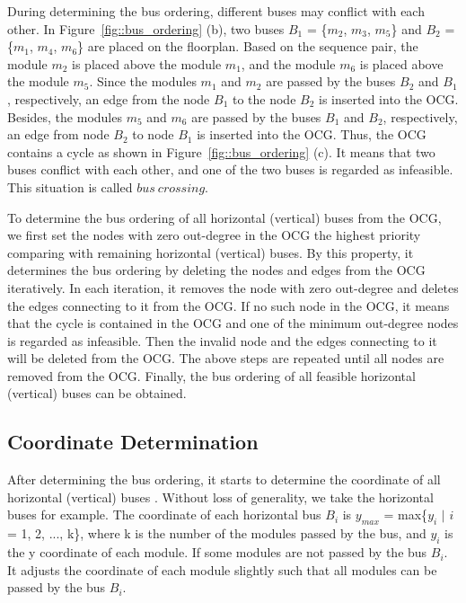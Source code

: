 During determining the bus ordering, different buses may conflict
with each other. In Figure~\ref{fig::bus_ordering} (b), two buses
$B_1$ = \{$m_2$, $m_3$, $m_5$\} and $B_2$ = \{$m_1$, $m_4$,
$m_6$\} are placed on the floorplan. Based on the sequence
pair, the module $m_2$ is placed above the module $m_1$, and the
module $m_6$ is placed above the module $m_5$. Since the modules
$m_1$ and $m_2$ are passed by the buses $B_2$ and $B_1$,
respectively, an edge from the node $B_1$ to the node $B_2$ is
inserted into the OCG. Besides, the modules $m_5$ and $m_6$
are passed by the buses $B_1$ and $B_2$, respectively, an edge
from node $B_2$ to node $B_1$ is inserted into the OCG. Thus, the OCG
contains a cycle as shown in Figure~\ref{fig::bus_ordering} (c).
It means that two buses conflict with each other, and one of the
two buses is regarded as infeasible. This situation is called
$bus\ crossing$.

To determine the bus ordering of all horizontal (vertical) buses
from the OCG, we first set the nodes with zero out-degree in the
OCG the highest priority comparing with remaining horizontal
(vertical) buses. By this property, it determines the bus ordering
by deleting the nodes and edges from the OCG iteratively. In each
iteration, it removes the node with zero out-degree and deletes
the edges connecting to it from the OCG. If no such node in the
OCG, it means that the cycle is contained in the OCG and one of the
minimum out-degree nodes is regarded as infeasible. Then the
invalid node and the edges connecting to it will be deleted from
the OCG. The above steps are repeated until all nodes are removed
from the OCG. Finally, the bus ordering of all feasible horizontal
(vertical) buses can be obtained.
\subsection{Coordinate Determination}
\label{sec::Coordinate Determination} After determining the bus ordering, it
starts to determine the coordinate of all horizontal (vertical)
buses \cite{Xiang03}. Without loss of generality, we take the horizontal buses
for example. The coordinate of each horizontal bus $B_i$ is
$y_{max}$ = max\{$y_i$ $|$ $i$ = 1, 2, ..., k\}, where k is the
number of the modules passed by the bus, and $y_i$ is the y
coordinate of each module. If some modules are not passed by the bus $B_i$.
It adjusts the coordinate of each module slightly
such that all modules can be passed by the bus $B_i$.

